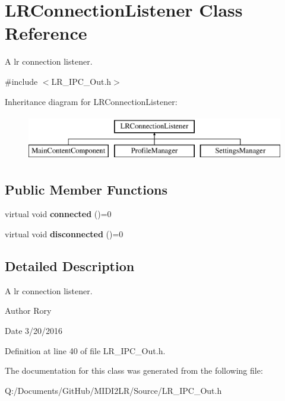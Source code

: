 \hypertarget{class_l_r_connection_listener}{}\section{L\+R\+Connection\+Listener Class Reference}
\label{class_l_r_connection_listener}


A lr connection listener.  




{\ttfamily \#include $<$L\+R\+\_\+\+I\+P\+C\+\_\+\+Out.\+h$>$}

Inheritance diagram for L\+R\+Connection\+Listener\+:\begin{figure}[H]
\begin{center}
\leavevmode
\includegraphics[height=2.000000cm]{class_l_r_connection_listener}
\end{center}
\end{figure}
\subsection*{Public Member Functions}
\begin{DoxyCompactItemize}
\item 
virtual void {\bfseries connected} ()=0\hypertarget{class_l_r_connection_listener_a751cf0a273f7bdd3c9d1c56ca495dfe0}{}\label{class_l_r_connection_listener_a751cf0a273f7bdd3c9d1c56ca495dfe0}

\item 
virtual void {\bfseries disconnected} ()=0\hypertarget{class_l_r_connection_listener_a77600d9569cff2499b049687b3c1ac8f}{}\label{class_l_r_connection_listener_a77600d9569cff2499b049687b3c1ac8f}

\end{DoxyCompactItemize}


\subsection{Detailed Description}
A lr connection listener. 

\begin{DoxyAuthor}{Author}
Rory 
\end{DoxyAuthor}
\begin{DoxyDate}{Date}
3/20/2016 
\end{DoxyDate}


Definition at line 40 of file L\+R\+\_\+\+I\+P\+C\+\_\+\+Out.\+h.



The documentation for this class was generated from the following file\+:\begin{DoxyCompactItemize}
\item 
Q\+:/\+Documents/\+Git\+Hub/\+M\+I\+D\+I2\+L\+R/\+Source/L\+R\+\_\+\+I\+P\+C\+\_\+\+Out.\+h\end{DoxyCompactItemize}
